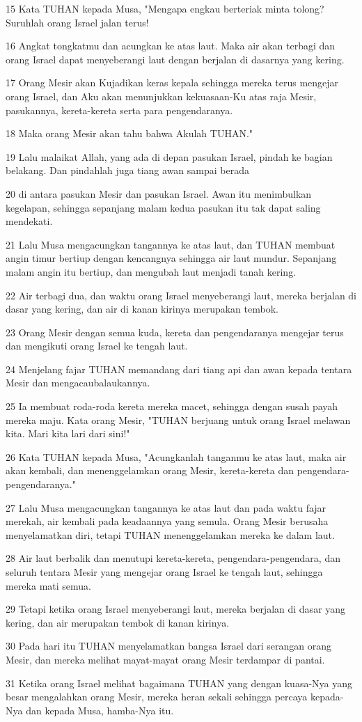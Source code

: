\par 15 Kata TUHAN kepada Musa, "Mengapa engkau berteriak minta tolong? Suruhlah orang Israel jalan terus!
\par 16 Angkat tongkatmu dan acungkan ke atas laut. Maka air akan terbagi dan orang Israel dapat menyeberangi laut dengan berjalan di dasarnya yang kering.
\par 17 Orang Mesir akan Kujadikan keras kepala sehingga mereka terus mengejar orang Israel, dan Aku akan menunjukkan kekuasaan-Ku atas raja Mesir, pasukannya, kereta-kereta serta para pengendaranya.
\par 18 Maka orang Mesir akan tahu bahwa Akulah TUHAN."
\par 19 Lalu malaikat Allah, yang ada di depan pasukan Israel, pindah ke bagian belakang. Dan pindahlah juga tiang awan sampai berada
\par 20 di antara pasukan Mesir dan pasukan Israel. Awan itu menimbulkan kegelapan, sehingga sepanjang malam kedua pasukan itu tak dapat saling mendekati.
\par 21 Lalu Musa mengacungkan tangannya ke atas laut, dan TUHAN membuat angin timur bertiup dengan kencangnya sehingga air laut mundur. Sepanjang malam angin itu bertiup, dan mengubah laut menjadi tanah kering.
\par 22 Air terbagi dua, dan waktu orang Israel menyeberangi laut, mereka berjalan di dasar yang kering, dan air di kanan kirinya merupakan tembok.
\par 23 Orang Mesir dengan semua kuda, kereta dan pengendaranya mengejar terus dan mengikuti orang Israel ke tengah laut.
\par 24 Menjelang fajar TUHAN memandang dari tiang api dan awan kepada tentara Mesir dan mengacaubalaukannya.
\par 25 Ia membuat roda-roda kereta mereka macet, sehingga dengan susah payah mereka maju. Kata orang Mesir, "TUHAN berjuang untuk orang Israel melawan kita. Mari kita lari dari sini!"
\par 26 Kata TUHAN kepada Musa, "Acungkanlah tanganmu ke atas laut, maka air akan kembali, dan menenggelamkan orang Mesir, kereta-kereta dan pengendara-pengendaranya."
\par 27 Lalu Musa mengacungkan tangannya ke atas laut dan pada waktu fajar merekah, air kembali pada keadaannya yang semula. Orang Mesir berusaha menyelamatkan diri, tetapi TUHAN menenggelamkan mereka ke dalam laut.
\par 28 Air laut berbalik dan menutupi kereta-kereta, pengendara-pengendara, dan seluruh tentara Mesir yang mengejar orang Israel ke tengah laut, sehingga mereka mati semua.
\par 29 Tetapi ketika orang Israel menyeberangi laut, mereka berjalan di dasar yang kering, dan air merupakan tembok di kanan kirinya.
\par 30 Pada hari itu TUHAN menyelamatkan bangsa Israel dari serangan orang Mesir, dan mereka melihat mayat-mayat orang Mesir terdampar di pantai.
\par 31 Ketika orang Israel melihat bagaimana TUHAN yang dengan kuasa-Nya yang besar mengalahkan orang Mesir, mereka heran sekali sehingga percaya kepada-Nya dan kepada Musa, hamba-Nya itu.


